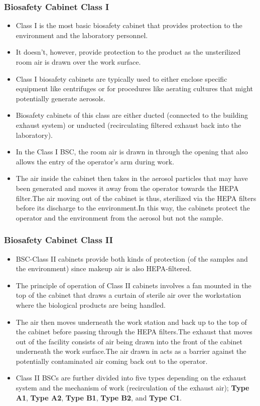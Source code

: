 \documentclass{article}
\begin{document}
\subsubsection{Biosafety Cabinet Class I}
\begin{itemize}
\item Class I is the most basic biosafety cabinet that provides protection to the environment and the laboratory personnel.
\item It doesn’t, however, provide protection to the product as the unsterilized room air is drawn over the work surface.
\item Class I biosafety cabinets are typically used to either enclose specific equipment like centrifuges or for procedures like aerating cultures that might potentially generate aerosols.
\item Biosafety cabinets of this class are either ducted (connected to the building exhaust system) or unducted (recirculating filtered exhaust back into the laboratory).
\item In the Class I BSC, the room air is drawn in through the opening that also allows the entry of the operator’s arm during work.
\item The air inside the cabinet then takes in the aerosol particles that may have been generated and moves it away from the operator towards the HEPA filter.The air moving out of the cabinet is thus, sterilized via the HEPA filters before its discharge to the environment.In this way, the cabinets protect the operator and the environment from the aerosol but not the sample.
\end{itemize}
\subsubsection{Biosafety Cabinet Class II}
\begin{itemize}
\item BSC-Class II cabinets provide both kinds of protection (of the samples and the environment) since makeup air is also HEPA-filtered.
\item The principle of operation of Class II cabinets involves a fan mounted in the top of the cabinet that draws a curtain of sterile air over the workstation where the biological products are being handled.
\item The air then moves underneath the work station and back up to the top of the cabinet before passing through the HEPA filters.The exhaust that moves out of the facility consists of air being drawn into the front of the cabinet underneath the work surface.The air drawn in acts as a barrier against the potentially contaminated air coming back out to the operator.
\item Class II BSCs are further divided into five types depending on the exhaust system and the mechanism of work (recirculation of the exhaust air); \textbf{Type A1}, \textbf{Type A2}, \textbf{Type B1}, \textbf{Type B2}, and \textbf{Type C1}.
\end{itemize}
\end{document}
